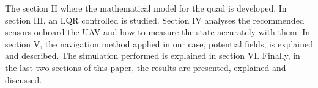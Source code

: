 \documentclass[journal]{IEEEtran}
\begin{document}
	The  section II where the mathematical model for the quad is developed. In section III, an LQR controlled is studied. Section IV analyses the recommended sensors onboard the UAV and how to measure the state accurately with them. In section V, the navigation method applied in our case, potential fields, is explained and described. The simulation performed is explained in section VI. Finally, in the last two sections of this paper, the results are presented, explained and discussed. 

	\hfill 
	
	
	
	
	
\end{document}

